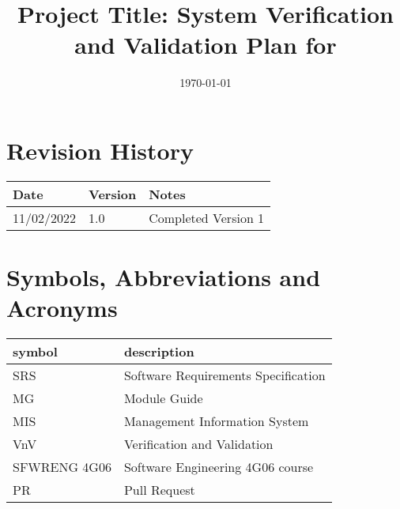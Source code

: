 \documentclass[12pt, titlepage]{article}
\begin{document}
	
	\title{Project Title: System Verification and Validation Plan for 
	\progname{}} 
	\author{\authname}
	\date{\today}
	
	\maketitle
	
	
	\section{Revision History}
	
	\begin{tabularx}{\textwidth}{p{3cm}p{2cm}X}
		\toprule {\bf Date} & {\bf Version} & {\bf Notes}\\
		\midrule
		11/02/2022 & 1.0 & Completed Version 1\\
		\bottomrule
	\end{tabularx}
	
	\newpage
	
	\tableofcontents
	
	\listoftables
	
	\listoffigures
	
	\newpage
	
	\section{Symbols, Abbreviations and Acronyms}
	
	\renewcommand{\arraystretch}{1.2}
	\begin{tabular}{l l} 
		\toprule		
		\textbf{symbol} & \textbf{description}\\
		\midrule 
		SRS & Software Requirements Specification\\
		MG & Module Guide\\
		MIS & Management Information System\\
		VnV & Verification and Validation\\
		SFWRENG 4G06& Software Engineering 4G06 course\\
		PR& Pull Request\\
		\bottomrule
	\end{tabular}\\
	
	
\end{document}
